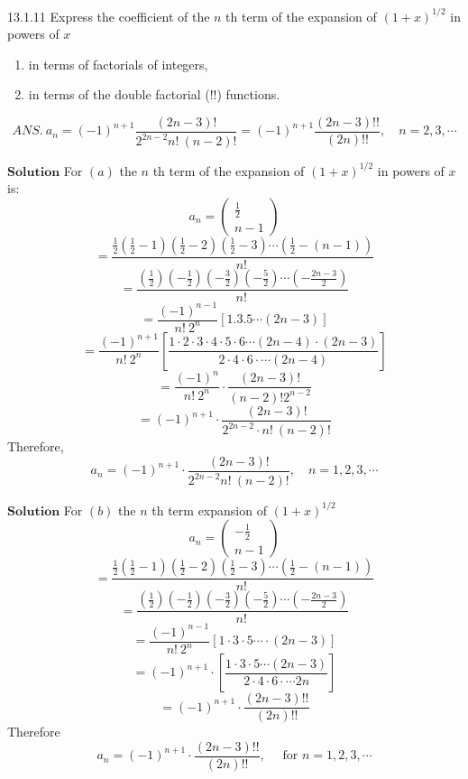 \newpage

\begin{mybox}{13.1.11}
Express the coefficient of the $n$ th term of the expansion of $(1+x)^{1 / 2}$ in powers of $x$
\begin{enumerate}[$(a)$]
\item in terms of factorials of integers,
\item in terms of the double factorial (!!) functions.
\end{enumerate} 
$$
A N S . \ a_{n}=(-1)^{n+1} \frac{(2 n-3) !}{2^{2 n-2} n! \ (n-2) !}=(-1)^{n+1} \frac{(2 n-3) ! !}{(2 n) ! !},\quad n=2,3,  \cdots
$$
\end{mybox}

$\boxed{\textbf{Solution}}$ For $(a)$ the $n$ th term of the expansion of $(1+x)^{1 / 2}$ in powers of $x$ is:
$$a_{n}=\left(\begin{array}{c}\frac{1}{2} \\ n-1\end{array}\right)$$
$$=\frac{\frac{1}{2}\left(\frac{1}{2}-1\right)\left(\frac{1}{2}-2\right)\left(\frac{1}{2}-3\right) \cdots\left(\frac{1}{2}-(n-1)\right)}{n! \ }$$
$$=\frac{\left(\frac{1}{2}\right)\left(-\frac{1}{2}\right)\left(-\frac{3}{2}\right)\left(-\frac{5}{2}\right) \cdots\left(-\frac{2 n-3}{2}\right)}{n! \ }$$
$$=\frac{(-1)^{n-1}}{n! \  2^{n}}[1.3 .5   \cdots (2 n-3)]$$
$$=\frac{(-1)^{n+1}}{n! \  2^{n}}\left[\frac{1\cdot 2  \cdot 3  \cdot 4  \cdot 5  \cdot 6  \cdots (2 n-4) \cdot(2 n-3)}{2 \cdot 4  \cdot 6  \cdot   \cdots (2 n-4)}\right]$$
$$=\frac{(-1)^{n}}{n! \  2^{n}} \cdot \frac{(2 n-3) !}{(n-2) ! 2^{n-2}}$$
$$=(-1)^{n+1} \cdot \frac{(2 n-3) !}{2^{2 n-2} \cdot n! \ (n-2) !}$$
Therefore, 
$$
a_{n}=(-1)^{n+1} \cdot \frac{(2 n-3) !}{2^{2 n-2} n! \ (n-2) !}, \quad  n=1,2,3, \cdots
$$

$\boxed{\textbf{Solution}}$ For $(b)$ the $n$ th term expansion of $(1+x)^{1 / 2}$ 
$$a_{n}=\left(\begin{array}{c}-\frac{1}{2} \\ n-1\end{array}\right)$$
$$=\frac{\frac{1}{2}\left(\frac{1}{2}-1\right)\left(\frac{1}{2}-2\right)\left(\frac{1}{2}-3\right) \cdots\left(\frac{1}{2}-(n-1)\right)}{n! \ }$$
$$=\frac{\left(\frac{1}{2}\right)\left(-\frac{1}{2}\right)\left(-\frac{3}{2}\right)\left(-\frac{5}{2}\right) \cdots\left(-\frac{2 n-3}{2}\right)}{n! \ }$$
$$=\frac{(-1)^{n-1}}{n! \  2^{n}}[1 \cdot 3  \cdot 5  \cdots  \cdot(2 n-3)]$$
$$=(-1)^{n+1} \cdot\left[\frac{1 \cdot 3  \cdot 5  \cdots (2 n-3)}{2 \cdot 4  \cdot 6 \cdot  \cdots 2 n}\right]$$
$$=(-1)^{n+1} \cdot \frac{(2 n-3) ! !}{(2 n) ! !}$$
Therefore
$$
a_{n}=(-1)^{n+1} \cdot \frac{(2 n-3) ! !}{(2 n) ! !}, \quad \text { for } n=1,2,3, \cdots
$$

